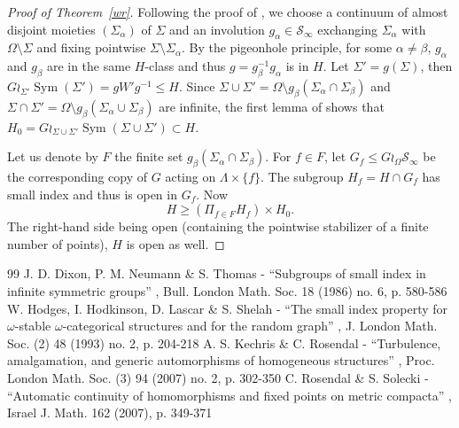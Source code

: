 \documentclass[11pt]{article}
\let\mathcal\mathscr
\theoremstyle{plain}
\theoremstyle{definition}
\newcommand{\cS}{\mathcal{S}}
\newcommand{\sinf}{\cS_\infty}
\DeclareMathOperator{\Sym}{Sym}
\begin{document}
\begin{proof}[Proof of Theorem~\ref{wr}]
Following the proof of \cite[Th.\,1]{MR859950}, we choose a continuum of almost disjoint moieties $(\Sigma_\alpha)$ of $\Sigma$ and an involution $g_\alpha\in\sinf$ exchanging $\Sigma_\alpha$ with $\Omega\setminus\Sigma$ and fixing pointwise $\Sigma\setminus\Sigma_\alpha$. By the pigeonhole principle, for some $\alpha\neq\beta$, $g_\alpha$ and $g_\beta$ are in the same $H$-class and thus $g=g_\beta^{-1} g_\alpha$ is in $H$. Let $\Sigma'=g(\Sigma)$, then $G\wr_{\Sigma'}\Sym(\Sigma')=gW'g^{-1}\leq H$. Since $\Sigma\cup\Sigma'=\Omega\setminus g_\beta(\Sigma_\alpha\cap\Sigma_\beta)$ and $\Sigma\cap\Sigma'=\Omega\setminus g_\beta(\Sigma_\alpha\cup\Sigma_\beta)$ are infinite, the first lemma of \cite{MR859950} shows that $H_0=G\wr_{\Sigma\cup\Sigma'}\Sym(\Sigma\cup\Sigma')\subset H$.

Let us denote by $F$ the finite set $g_\beta(\Sigma_\alpha\cap\Sigma_\beta)$. For $f\in F$, let $G_f\leq G\wr_\Omega\sinf$ be the corresponding copy of $G$ acting on $\Lambda\times\{f\}$. The subgroup $H_f=H\cap G_f$ has small index and thus is open in $G_f$. Now
\[
H\geq\left(\Pi_{f\in F}H_f\right)\times H_0.
\]
The right-hand side being open (containing the pointwise stabilizer of a finite number of points), $H$ is open as well.
\end{proof}


\begin{thebibliography}{99}
 J. D. Dixon, P. M. Neumann \& S. Thomas - “Subgroups of small index in infinite symmetric groups” , Bull. London Math. Soc. 18 (1986) no. 6, p. 580-586
 W. Hodges, I. Hodkinson, D. Lascar \& S. Shelah - “The small index property for $\omega $-stable $\omega $-categorical structures and for the random graph” , J. London Math. Soc. (2) 48 (1993) no. 2, p. 204-218
 A. S. Kechris \& C. Rosendal - “Turbulence, amalgamation, and generic automorphisms of homogeneous structures” , Proc. London Math. Soc. (3) 94 (2007) no. 2, p. 302-350
 C. Rosendal \& S. Solecki - “Automatic continuity of homomorphisms and fixed points on metric compacta” , Israel J. Math. 162 (2007), p. 349-371
\end{thebibliography}
\end{document}

